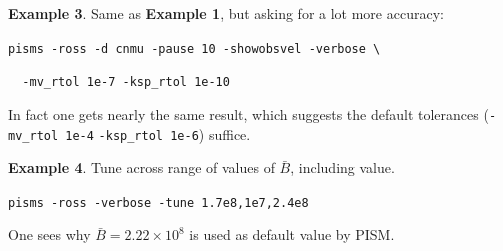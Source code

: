 \documentclass[12pt,final]{amsart}
\begin{document}
\bigskip
\noindent\textbf{Example 3}.  Same as \textbf{Example 1}, but asking for a lot more accuracy:

\verb|pisms -ross -d cnmu -pause 10 -showobsvel -verbose \|

\verb|  -mv_rtol 1e-7 -ksp_rtol 1e-10|

\noindent In fact one gets nearly the same result,  which suggests the default tolerances (\verb|-mv_rtol 1e-4| \verb|-ksp_rtol 1e-6|) suffice.

\bigskip
\noindent\textbf{Example 4}.  Tune across range of values of $\bar B$, including \cite{MacAyealetal}
value.

\verb|pisms -ross -verbose -tune 1.7e8,1e7,2.4e8|

\noindent One sees why $\bar B = 2.22\times 10^8$ is used as default value by PISM.
\end{document}
